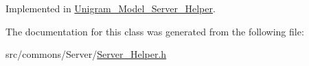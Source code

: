 Implemented in \hyperlink{class_unigram___model___server___helper_a44b942cb380cbb1207bc994ac14a368c}{Unigram\_\-Model\_\-Server\_\-Helper}.



The documentation for this class was generated from the following file:\begin{DoxyCompactItemize}
\item 
src/commons/Server/\hyperlink{_server___helper_8h}{Server\_\-Helper.h}\end{DoxyCompactItemize}
